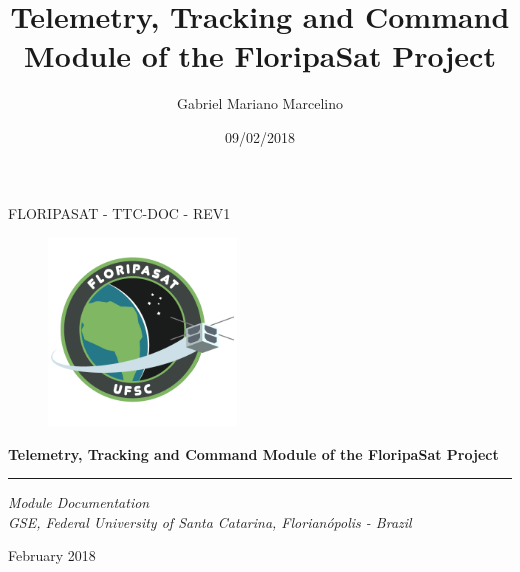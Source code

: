 \documentclass[12pt]{book}
\title{Telemetry, Tracking and Command Module of the FloripaSat Project}
\author{Gabriel Mariano Marcelino}
\date{09/02/2018}
\begin{document}
\begin{titlepage}

\thispagestyle{empty}

\begin{flushleft}
FLORIPASAT - TTC-DOC - REV1
\end{flushleft}

\begin{figure}[!ht]
	\begin{flushleft}
		\includegraphics[width=5cm]{figures/floripasat.png}
	\end{flushleft}
\end{figure}

\begin{flushleft}
\Huge{\textbf{Telemetry, Tracking and Command Module of the FloripaSat Project}}
\rule[0pt]{\textwidth}{5pt}
\end{flushleft}

\vspace{0.2cm}

\begin{flushleft}
\textit{Module Documentation} \\
\textit{GSE, Federal University of Santa Catarina, Florianópolis - Brazil}
\end{flushleft}

\vfill
\vfill

\begin{flushright}
February 2018
\end{flushright}

\setcounter{page}{1}

\end{titlepage}

\cleardoublepage

\end{document}
